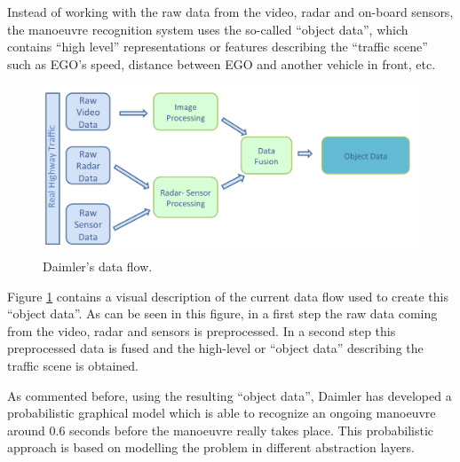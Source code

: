 Instead of working with the raw data from the video, radar and on-board sensors, the manoeuvre recognition system uses the so-called ``object data'', which contains ``high level'' representations or features describing the ``traffic scene'' such as EGO's speed, distance between EGO and another vehicle in front, etc.  
\begin{figure}
\begin{center}
\includegraphics[scale=0.35]{./figures/DaimlerDataFlow}
\caption{\label{Figure:DaimlerDataFlow} Daimler's data flow.}
\end{center}
\end{figure}

Figure \ref{Figure:DaimlerDataFlow} contains a visual description of the current data flow used to create this ``object data''.  As can be seen in this figure, in a first step the raw data coming from the video, radar and sensors is preprocessed. In a second step this preprocessed data is fused and the high-level or ``object data'' describing the traffic scene is obtained. 

As commented before, using the resulting ``object data'', Daimler has developed a probabilistic graphical model \cite{kasper2012object} which is able to recognize an ongoing manoeuvre around 0.6 seconds before the manoeuvre really takes place.  This probabilistic approach is based on modelling the problem in different abstraction layers. 


%
%
%

